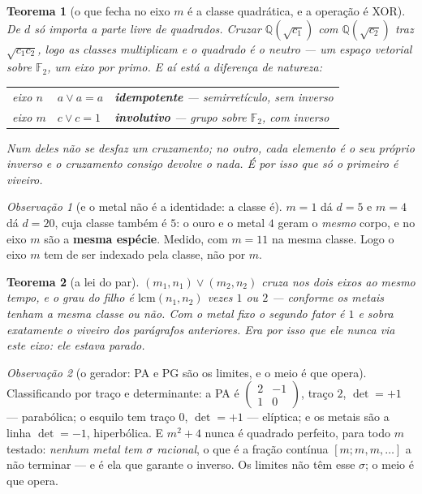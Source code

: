 \documentclass[11pt]{article}
\newcommand{\Q}{\mathbb Q}
\newcommand{\Fp}{\mathbb F}
\theoremstyle{plain}
\newtheorem{teorema}{Teorema}
\theoremstyle{remark}
\newtheorem{obs}{Observação}
\begin{document}
\begin{teorema}[o que fecha no eixo $m$ é a classe quadrática, e a operação é XOR]
De $d$ só importa a parte livre de quadrados. Cruzar $\Q(\sqrt{c_1})$ com $\Q(\sqrt{c_2})$ traz
$\sqrt{c_1c_2}$, logo as classes \emph{multiplicam} e o quadrado é o neutro --- um espaço vetorial
sobre $\Fp_2$, um eixo por primo. E aí está a diferença de natureza:
\begin{center}
\begin{tabular}{lll}
\toprule
eixo $n$ & $a\vee a=a$ & \textbf{idempotente} --- semirretículo, sem inverso\\
eixo $m$ & $c\vee c=1$ & \textbf{involutivo} --- grupo sobre $\Fp_2$, com inverso\\
\bottomrule
\end{tabular}
\end{center}
Num deles não se desfaz um cruzamento; no outro, cada elemento é o seu próprio inverso e o
cruzamento consigo devolve o \emph{nada}. É por isso que só o primeiro é viveiro.
\end{teorema}

\begin{obs}[e o metal não é a identidade: a classe é]
$m=1$ dá $d=5$ e $m=4$ dá $d=20$, cuja classe também é $5$: o ouro e o metal $4$ geram o
\emph{mesmo} corpo, e no eixo $m$ são a \textbf{mesma espécie}. Medido, com $m=11$ na mesma
classe. Logo o eixo $m$ tem de ser indexado pela classe, não por $m$.
\end{obs}

\begin{teorema}[a lei do par]
$(m_1,n_1)\vee(m_2,n_2)$ cruza nos dois eixos ao mesmo tempo, e o grau do filho é
$\mathrm{lcm}(n_1,n_2)$ vezes $1$ ou $2$ --- conforme os metais tenham a mesma classe ou não. Com o
metal fixo o segundo fator é $1$ e sobra exatamente o viveiro dos parágrafos anteriores. \emph{Era
por isso que ele nunca via este eixo: ele estava parado.}
\end{teorema}

\begin{obs}[o gerador: PA e PG são os limites, e o meio é que opera]
Classificando por traço e determinante: a PA é $\left(\begin{smallmatrix}2&-1\\1&0\end{smallmatrix}
\right)$, traço $2$, $\det=+1$ --- parabólica; o esquilo tem traço $0$, $\det=+1$ --- elíptica; e os
metais são a linha $\det=-1$, hiperbólica. E $m^2+4$ nunca é quadrado perfeito, para todo $m$
testado: \emph{nenhum metal tem $\sigma$ racional}, o que é a fração contínua $[m;m,m,\dots]$ a não
terminar --- e é ela que garante o inverso. Os limites não têm esse $\sigma$; o meio é que opera.
\end{obs}
\end{document}
